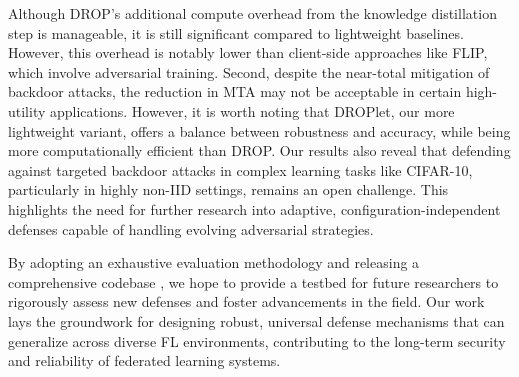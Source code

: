 Although DROP's additional compute overhead from the knowledge distillation step is manageable, it is still significant compared to lightweight baselines. However, this overhead is notably lower than client-side approaches like FLIP, which involve adversarial training. Second, despite the near-total mitigation of backdoor attacks, the reduction in MTA may not be acceptable in certain high-utility applications. However, it is worth noting that DROPlet, our more lightweight variant, offers a balance between robustness and accuracy, while being more computationally efficient than DROP.
Our results also reveal that defending against targeted backdoor attacks in complex learning tasks like CIFAR-10, particularly in highly non-IID settings, remains an open challenge. This highlights the need for further research into adaptive, configuration-independent defenses capable of handling evolving adversarial strategies.

By adopting an exhaustive evaluation methodology and releasing a comprehensive codebase%
, we hope to provide a testbed for future researchers to rigorously assess new defenses and foster advancements in the field. Our work lays the groundwork for designing robust, universal defense mechanisms that can generalize across diverse FL environments, contributing to the long-term security and reliability of federated learning systems.